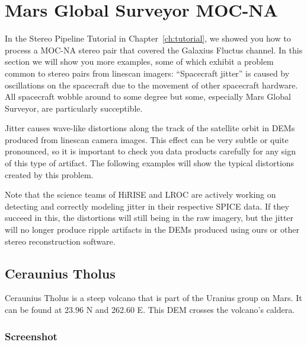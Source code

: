 \section{Mars Global Surveyor MOC-NA}

In the Stereo Pipeline Tutorial in Chapter~\ref{ch:tutorial}, we
showed you how to process a MOC-NA stereo pair that covered the
Galaxius Fluctus channel. In this section we will show you more
examples, some of which exhibit a problem common to stereo pairs from
linescan imagers: ``Spacecraft jitter'' is caused by oscillations on
the spacecraft due to the movement of other spacecraft hardware.  All
spacecraft wobble around to some degree but some, especially Mars
Global Surveyor, are particularly succeptible.

Jitter causes wave-like distortions along the track of the satellite
orbit in DEMs produced from linescan camera images.  This effect can
be very subtle or quite pronounced, so it is important to check you
data products carefully for any sign of this type of artifact. The
following examples will show the typical distortions created by this
problem.

Note that the science teams of HiRISE and LROC are actively working on
detecting and correctly modeling jitter in their respective SPICE
data. If they succeed in this, the distortions will still being in the
raw imagery, but the jitter will no longer produce ripple artifacts in
the DEMs produced using ours or other stereo reconstruction software.

\subsection{Ceraunius Tholus}

Ceraunius Tholus is a steep volcano that is part of the Uranius group
on Mars. It can be found at 23.96 N and 262.60 E. This DEM crosses the
volcano's caldera.

\subsubsection*{Screenshot}


